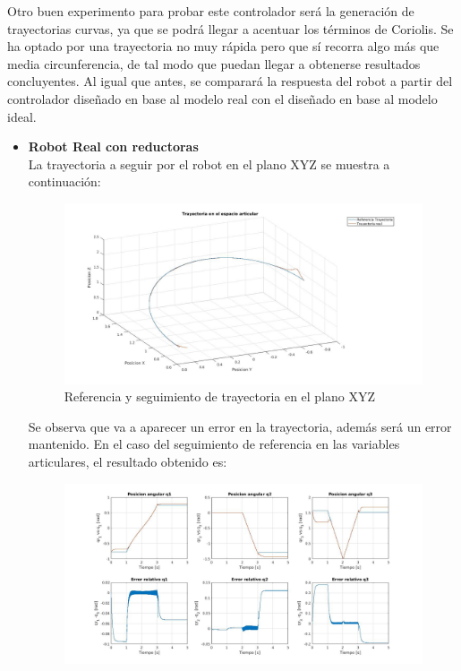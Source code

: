 Otro buen experimento para probar este controlador será la generación de trayectorias curvas, ya que se podrá llegar a acentuar los términos de Coriolis. Se ha optado por una trayectoria no muy rápida pero que sí recorra algo más que media circunferencia, de tal modo que puedan llegar a obtenerse resultados concluyentes. Al igual que antes, se comparará la respuesta del robot a partir del controlador diseñado en base al modelo real con el diseñado en base al modelo ideal. \\
\newpage
\begin{itemize}
	
	\item \textbf{Robot Real con reductoras} \\
	
	La trayectoria a seguir por el robot en el plano XYZ se muestra a continuación:
	
	
	
	\begin{figure}[h!]
		
		\centering
		
		\includegraphics[width=.8\textwidth]{exp3_trayPDreal_circular}
		
		\caption{Referencia y seguimiento de trayectoria en el plano XYZ}
		
	\end{figure}
	
	
	
	Se observa que va a aparecer un error en la trayectoria, además será un error mantenido. En el caso del seguimiento de referencia en las variables articulares, el resultado obtenido es:
	
	
	
	\begin{figure}[h!]
		
		\centering
		
		\includegraphics[width=.8\textwidth]{exp3_posPDrealCR_circular}
		

\end{figure}
\end{itemize}

